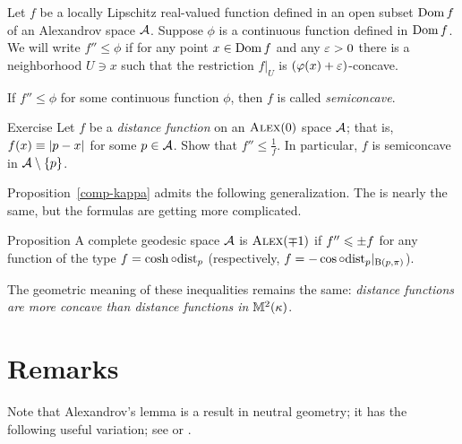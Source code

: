 Let $f$ be a locally Lipschitz real-valued function defined in an open subset $\mathop{\rm Dom}\nolimits f$ of an Alexandrov space $\mathcal{A}$.
Suppose $\phi$ is a continuous function defined in $\mathop{\rm Dom}\nolimits f$.
We will write $f''\le \phi$ if for any point $x\in \mathop{\rm Dom}\nolimits f$ and any $\varepsilon>0$ there is a neighborhood $U\ni x$ such that
the restriction $f|_U$ is $(\varphi(x)+\varepsilon)$-concave.

If $f''\le \phi$ for some continuous function $\phi$, then $f$ is called  \emph{semiconcave}.

\begin{thm}{Exercise}\label{ex:distfun-semiconcave}
Let $f$ be a \emph{distance function} on an $\textsc{Alex}(0)$ space $\mathcal{A}$;
that is, $f(x)\equiv|{p}-{x}|_{}^{{}}$ for some $p\in \mathcal{A}$.
Show that $f''\le \tfrac1f$.
In particular, $f$ is semiconcave in $\mathcal{A}\setminus\{p\}$.
\end{thm}

Proposition~\ref{comp-kappa} admits the following generalization.
The is nearly the same, but the formulas are getting more complicated.

\begin{thm}{Proposition}
A complete geodesic space $\mathcal{A}$ is $\textsc{Alex}(\mp1)$
if $f''\leqslant \pm f$ for any function of the type $f=\cosh\circ\mathrm{dist}_p$ (respectively, $f=-\cos\circ\mathrm{dist}_p|_{\mathrm{B}{}(p,\pi)}$).
\end{thm}

The geometric meaning of these inequalities remains the same:
\textit{distance functions are more concave than distance functions in $\mathbb{M}^2(\kappa)$}.

\section{Remarks}

Note that Alexandrov's lemma is a result in neutral geometry;
it has the following useful variation; see \cite[10.2]{alexander-kapovitch-petrunin2024} or \cite[3.3]{alexander-kapovitch-kirszbraun}.

